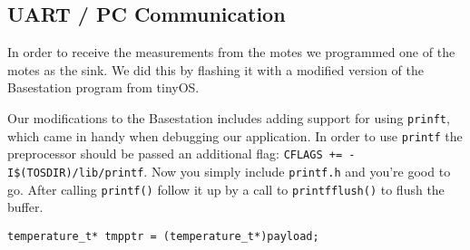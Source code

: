 \subsection{UART / PC Communication}
In order to receive the measurements from the motes we programmed one
of the motes as the sink. We did this by flashing it with a modified
version of the Basestation program from tinyOS.

Our modifications to the Basestation includes adding support for using
\texttt{prinft}, which came in handy when debugging our application.
In order to use \texttt{printf} the preprocessor should be passed an
additional flag: \texttt{CFLAGS += -I\$(TOSDIR)/lib/printf}.  Now you
simply include \texttt{printf.h} and you're good to go. After calling
\texttt{printf()} follow it up by a call to \texttt{printfflush()} to
flush the buffer.



\begin{lstlisting}[caption={BaseStationP.cp casting the payload}]
temperature_t* tmpptr = (temperature_t*)payload;
\end{lstlisting}

